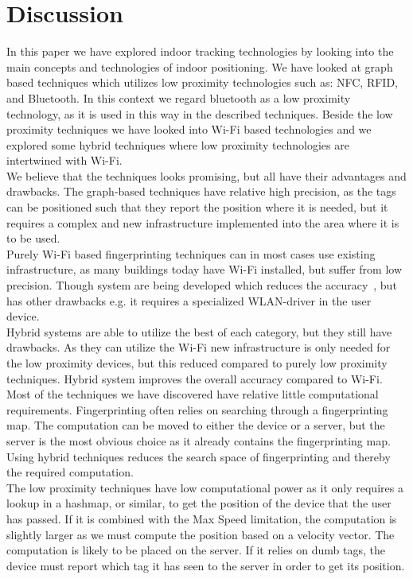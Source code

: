 \section{Discussion}
In this paper we have explored indoor tracking technologies by looking into the main concepts and technologies of indoor positioning. 
We have looked at graph based techniques which utilizes low proximity technologies such as: NFC, RFID, and Bluetooth. 
In this context we regard bluetooth as a low proximity technology, as it is used in this way in the described techniques. 
Beside the low proximity techniques we have looked into Wi-Fi based technologies and we explored some hybrid techniques where low proximity technologies are intertwined with Wi-Fi. \\

We believe that the techniques looks promising, but all have their advantages and drawbacks. 
The graph-based techniques have relative high precision, as the tags can be positioned such that they report the position where it is needed, but it requires a complex and new infrastructure implemented into the area where it is to be used. \\

Purely Wi-Fi based fingerprinting techniques can in most cases use existing infrastructure, as many buildings today  have Wi-Fi installed, but suffer from low precision.
Though system are being developed which reduces the accuracy~\cite{Youssef2005}, but has other drawbacks e.g. it requires a specialized WLAN-driver in the user device. \\

Hybrid systems are able to utilize the best of each category, but they still have drawbacks. 
As they can utilize the Wi-Fi new infrastructure is only needed for the low proximity devices, but this reduced compared to purely low proximity techniques. 
Hybrid system improves the overall accuracy compared to Wi-Fi. \\

Most of the techniques we have discovered have relative little computational requirements. 
Fingerprinting often relies on searching through a fingerprinting map. 
The computation can be moved to either the device or a server, but the server is the most obvious choice as it already contains the fingerprinting map. 
Using hybrid techniques reduces the search space of fingerprinting and thereby the required computation. \\

The low proximity techniques have low computational power as it only requires a lookup in a hashmap, or similar, to get the position of the device that the user has passed. 
If it is combined with the Max Speed limitation, the computation is slightly larger as we must compute the position based on a velocity vector. 
The computation is likely to be placed on the server. 
If it relies on dumb tags, the device must report which tag it has seen to the server in order to get its position. \\


